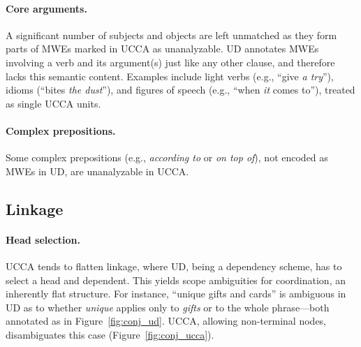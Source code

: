 \documentclass[11pt,a4paper]{article}
\begin{document}
\paragraph{Core arguments.}
      A significant number of subjects and objects are left unmatched as they
      form parts of MWEs marked in UCCA as unanalyzable. UD annotates
      MWEs involving a verb and its argument(s) just like any other clause, and therefore
      lacks this semantic content. Examples include light verbs (e.g., ``give {\it a try}''),
      idioms (``bites {\it the dust}''), and figures of speech (e.g., ``when \textit{it} comes to''),
      treated as single UCCA units.
      
\paragraph{Complex prepositions.} Some complex prepositions (e.g., \textit{according to} or \textit{on top of}),
      not encoded as MWEs in UD, are unanalyzable in UCCA.


\subsection{Linkage}\label{sec:linkage}

\paragraph{Head selection.}
UCCA tends to flatten linkage, where UD, being a dependency scheme,
has to select a head and dependent.
This yields scope ambiguities for coordination, an inherently flat structure. 
For instance, ``unique gifts and cards'' is ambiguous in UD as to whether
\textit{unique} applies only to \textit{gifts} or to the whole phrase---both
annotated as in Figure~\ref{fig:conj_ud}.
UCCA, allowing non-terminal nodes, disambiguates this case (Figure~\ref{fig:conj_ucca}).

\end{document}
